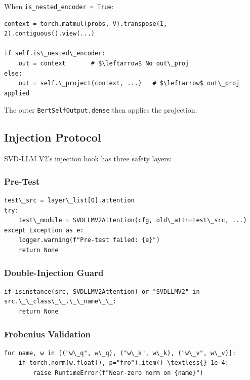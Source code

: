 When \texttt{is\_nested\_encoder = True}:

\begin{lstlisting}
context = torch.matmul(probs, V).transpose(1, 2).contiguous().view(...)

if self.is\_nested\_encoder:
    out = context       # $\leftarrow$ No out\_proj
else:
    out = self.\_project(context, ...)   # $\leftarrow$ out\_proj applied
\end{lstlisting}

The outer \texttt{BertSelfOutput.dense} then applies the projection.

\subsection{Injection Protocol}

SVD-LLM V2's injection hook has three safety layers:

\subsubsection{Pre-Test}

\begin{lstlisting}
test\_src = layer\_list[0].attention
try:
    test\_module = SVDLLMV2Attention(cfg, old\_attn=test\_src, ...)
except Exception as e:
    logger.warning(f"Pre-test failed: {e}")
    return None
\end{lstlisting}

\subsubsection{Double-Injection Guard}

\begin{lstlisting}
if isinstance(src, SVDLLMV2Attention) or "SVDLLMV2" in src.\_\_class\_\_.\_\_name\_\_:
    return None
\end{lstlisting}

\subsubsection{Frobenius Validation}

\begin{lstlisting}
for name, w in [("w\_q", w\_q), ("w\_k", w\_k), ("w\_v", w\_v)]:
    if torch.norm(w.float(), p="fro").item() \textless{} 1e-4:
        raise RuntimeError(f"Near-zero norm on {name}")
\end{lstlisting}

